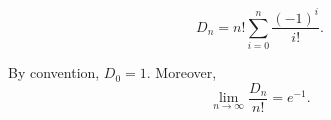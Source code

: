 $$D_n = n! \sum_{i=0}^{n} \frac{(-1)^i}{i!}.$$

By convention, $D_0 = 1$. Moreover,
$$\lim_{n \to \infty} \frac{D_n}{n!} = e^{-1}.$$

